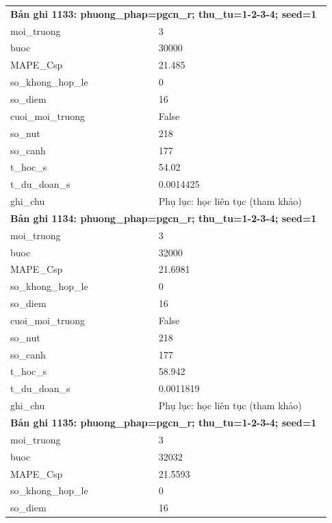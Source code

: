 \begin{longtable}{p{0.43\linewidth}p{0.50\linewidth}}
\midrule
\multicolumn{2}{p{0.95\linewidth}}{\textbf{Bản ghi 1133: phuong\_phap=pgcn\_r; thu\_tu=1-2-3-4; seed=1}} \\
moi\_\allowbreak truong & 3 \\
buoc & 30000 \\
MAPE\_\allowbreak Csp & 21.485 \\
so\_\allowbreak khong\_\allowbreak hop\_\allowbreak le & 0 \\
so\_\allowbreak diem & 16 \\
cuoi\_\allowbreak moi\_\allowbreak truong & False \\
so\_\allowbreak nut & 218 \\
so\_\allowbreak canh & 177 \\
t\_\allowbreak hoc\_\allowbreak s & 54.02 \\
t\_\allowbreak du\_\allowbreak doan\_\allowbreak s & 0.0014425 \\
ghi\_\allowbreak chu & Phụ lục: học liên tục (tham khảo) \\
\midrule
\multicolumn{2}{p{0.95\linewidth}}{\textbf{Bản ghi 1134: phuong\_phap=pgcn\_r; thu\_tu=1-2-3-4; seed=1}} \\
moi\_\allowbreak truong & 3 \\
buoc & 32000 \\
MAPE\_\allowbreak Csp & 21.6981 \\
so\_\allowbreak khong\_\allowbreak hop\_\allowbreak le & 0 \\
so\_\allowbreak diem & 16 \\
cuoi\_\allowbreak moi\_\allowbreak truong & False \\
so\_\allowbreak nut & 218 \\
so\_\allowbreak canh & 177 \\
t\_\allowbreak hoc\_\allowbreak s & 58.942 \\
t\_\allowbreak du\_\allowbreak doan\_\allowbreak s & 0.0011819 \\
ghi\_\allowbreak chu & Phụ lục: học liên tục (tham khảo) \\
\midrule
\multicolumn{2}{p{0.95\linewidth}}{\textbf{Bản ghi 1135: phuong\_phap=pgcn\_r; thu\_tu=1-2-3-4; seed=1}} \\
moi\_\allowbreak truong & 3 \\
buoc & 32032 \\
MAPE\_\allowbreak Csp & 21.5593 \\
so\_\allowbreak khong\_\allowbreak hop\_\allowbreak le & 0 \\
so\_\allowbreak diem & 16 \\

\end{longtable}
